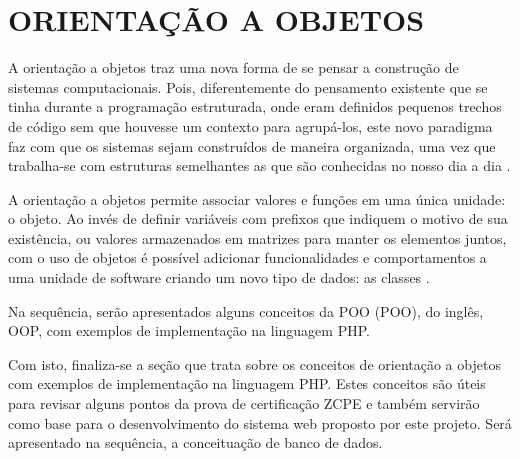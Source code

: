 \section{ORIENTAÇÃO A OBJETOS}

A orientação a objetos traz uma nova forma de se pensar a construção de sistemas
computacionais. Pois, diferentemente do pensamento existente que se tinha
durante a programação estruturada, onde eram definidos pequenos trechos de 
código sem que houvesse um contexto para agrupá-los, este novo paradigma faz 
com que os sistemas sejam construídos de maneira organizada, uma vez que 
trabalha-se com estruturas semelhantes as que são conhecidas no nosso dia a dia
\cite{phpProgramandoComOrientacaoAObjetos}.

A orientação a objetos permite associar valores e funções em uma única
unidade: o objeto. Ao invés de definir variáveis com prefixos que indiquem o 
motivo de sua existência, ou valores armazenados em matrizes para manter os 
elementos juntos, com o uso de objetos é possível adicionar funcionalidades e 
comportamentos a uma unidade de software criando um novo tipo de dados: as 
classes \cite{phpMasterWriteCuttingEdgeCode}.

Na sequência, serão apresentados alguns conceitos da \acl{POO} (\acs{POO}), do
inglês, \ac{OOP}, com exemplos de implementação na linguagem \acs{PHP}.















Com isto, finaliza-se a seção que trata sobre os conceitos de orientação a
objetos com exemplos de implementação na linguagem \acs{PHP}. Estes conceitos
são úteis para revisar alguns pontos da prova de certificação \acs{ZCPE} e 
também servirão como base para o desenvolvimento do sistema web proposto por 
este projeto. Será apresentado na sequência, a conceituação de banco de dados.
